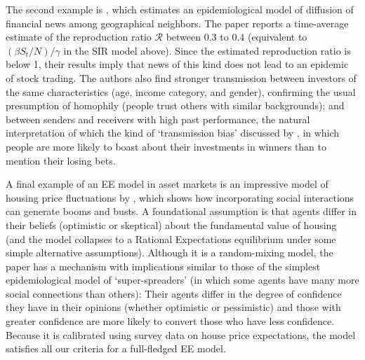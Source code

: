 The second example is \href{https://github.com/iworld1991/EpiExp/blob/master/Literature/huang2021rate.pdf}{ \cite{huang2021rate}}, which estimates an epidemiological model of diffusion of financial news among geographical neighbors. The paper reports a time-average estimate of the reproduction ratio $\mathcal{R}$ between $0.3$ to $0.4$ (equivalent to $(\beta S_t/N)/\gamma$ in the SIR model above).  Since the estimated reproduction ratio is below  1, their results imply that news of this kind does not lead to an epidemic of stock trading.    The authors also find stronger transmission between investors of the same characteristics (age, income category, and gender), confirming the usual presumption of homophily (people trust others with similar backgrounds); and between senders and receivers with high past performance, the natural interpretation of which the kind of `transmission bias' discussed by \cite{han2022social}, in which people are more likely to boast about their investments in winners than to mention their losing bets.

A final example of an EE model in asset markets is an impressive model of housing price fluctuations by \href{https://www.journals.uchicago.edu/doi/abs/10.1086/686732}{\cite{burnside_understanding_2016}}, which shows how incorporating social interactions can generate booms and busts. A foundational assumption is that agents differ in their beliefs (optimistic or skeptical) about the fundamental value of housing (and the model collapses to a Rational Expectations equilibrium under some simple alternative assumptions).  Although it is a random-mixing model, the paper has a mechanism with implications similar to those of the simplest epidemiological model of `super-spreaders' (in which some agents have many more social connections than others):  Their agents differ in the degree of confidence they have in their opinions (whether optimistic or pessimistic) and those with greater confidence are more likely to convert those who have less confidence.  Because it is calibrated using survey data on house price expectations, the model satisfies all our criteria for a full-fledged EE model.

